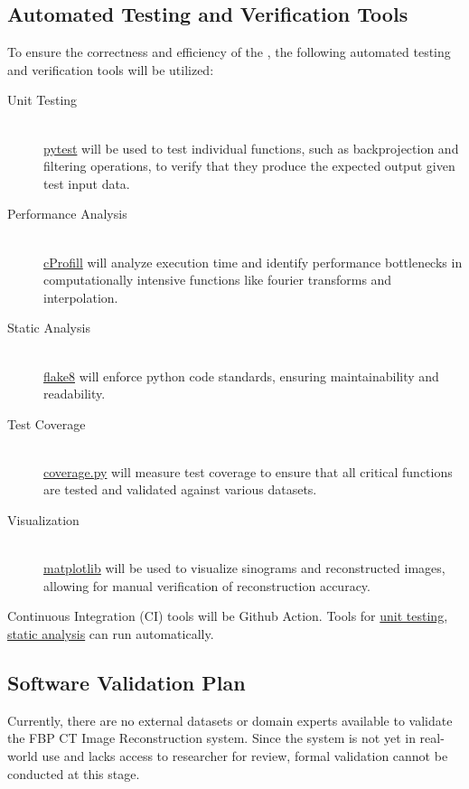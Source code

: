 \documentclass[12pt, titlepage]{article}
\begin{document}
\subsection{Automated Testing and Verification Tools} \label{3.6} To ensure the
correctness and efficiency of the \progname, the following automated
testing and verification tools will be utilized:
\begin{description}
\item[Unit Testing] \hfill \\
  \href{https://docs.pytest.org/en/stable/}{pytest} will be used to test
  individual functions, such as backprojection and filtering operations, to
  verify that they produce the expected output given test input data.
\item[Performance Analysis] \hfill \\
  \href{https://docs.python.org/3/library/profile.html#module-cprofile}{cProfill}
  will analyze execution time and identify performance bottlenecks in
  computationally intensive functions like fourier transforms and interpolation.
\item[Static Analysis] \hfill \\
  \href{https://flake8.pycqa.org/en/latest/}{flake8} will enforce python code
  standards, ensuring maintainability and readability.
\item[Test Coverage] \hfill \\
  \href{https://coverage.readthedocs.io/en/7.6.12/}{coverage.py} will measure
  test coverage to ensure that all critical functions are tested and validated
  against various datasets.
\item[Visualization] \hfill \\
  \href{https://matplotlib.org/}{matplotlib} will be used to visualize sinograms
  and reconstructed images, allowing for manual verification of reconstruction
  accuracy.
\end{description}
Continuous Integration (CI) tools will be Github Action. Tools for
\href{https://github.com/marketplace/actions/run-pytest}{unit testing},
\href{https://github.com/marketplace/actions/flake8-action}{static analysis} can
run automatically.

\subsection{Software Validation Plan} \label{3.7} Currently, there are no
external datasets or domain experts available to validate the FBP CT Image
Reconstruction system. Since the system is not yet in real-world use and lacks
access to researcher for review, formal validation cannot be conducted at this
stage.
\end{document}
